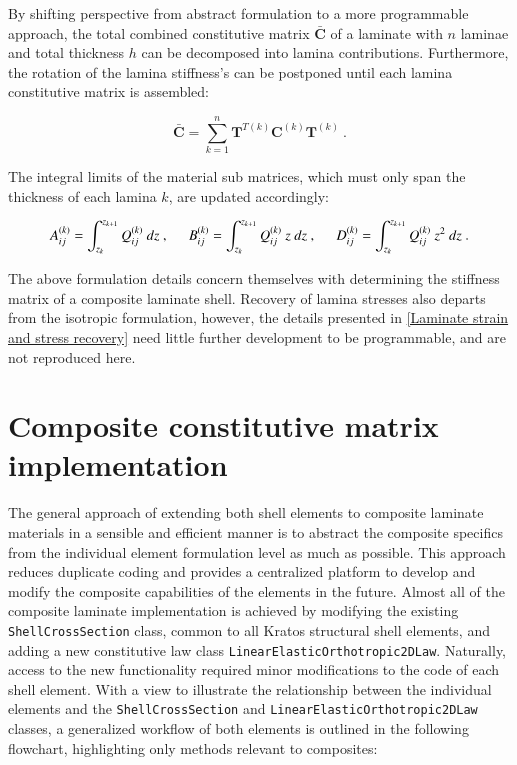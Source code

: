 By shifting perspective from abstract formulation to a more programmable approach, the total combined constitutive matrix $\bar{\mathbf{C}}$ of a laminate with $n$ laminae and total thickness $h$ can be decomposed into lamina contributions. Furthermore, the rotation of the lamina stiffness's can be postponed until each lamina constitutive matrix is assembled:

\begin{equation} 
 \bar{\mathbf{C}} = \sum_{k=1}^{n}  \mathbf{T}^{T(k)} {\mathbf{C}}^{(k)}  \mathbf{T}^{(k)}
\label{eqscomp_laminate_form3}\ .
\end{equation}

The integral limits of the material sub matrices, which must only span the thickness of each lamina $k$, are updated accordingly:

\begin{equation} 
A_{ij}^{(k)} = 
\int_{z_k}^{z_{k+1}}
{Q}_{ij}^{(k)}
\ dz\ ,
\hspace{5mm}
B_{ij}^{(k)} = 
\int_{z_k}^{z_{k+1}}
{Q}_{ij}^{(k)}\ z
\ dz\ ,
\hspace{5mm}
D_{ij}^{(k)} = 
\int_{z_k}^{z_{k+1}}
{Q}_{ij}^{(k)}\ z^2
\ dz
\label{eqscomp_laminate_form4}\ .
\end{equation} 

The above formulation details concern themselves with determining the stiffness matrix of a composite laminate shell. Recovery of lamina stresses also departs from the isotropic formulation, however, the details presented in \ref{Laminate strain and stress recovery} need little further development to be programmable, and are not reproduced here.

\section{Composite constitutive matrix implementation}
The general approach of extending both shell elements to composite laminate materials in a sensible and efficient manner is to abstract the composite specifics from the individual element formulation level as much as possible. This approach reduces duplicate coding and provides a centralized platform to develop and modify the composite capabilities of the elements in the future. Almost all of the composite laminate implementation is achieved by modifying the existing \texttt{ShellCrossSection} class, common to all Kratos structural shell elements, and adding a new constitutive law class \texttt{LinearElasticOrthotropic2DLaw}. Naturally, access to the new functionality required minor modifications to the code of each shell element. With a view to illustrate the relationship between the individual elements and the \texttt{ShellCrossSection} and \texttt{LinearElasticOrthotropic2DLaw} classes, a generalized workflow of both elements is outlined in the following flowchart, highlighting only methods relevant to composites:

